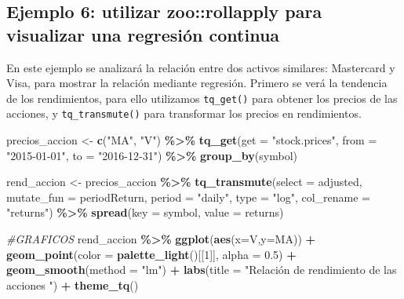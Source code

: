 \documentclass[
]{book}
\newenvironment{Shaded}{\begin{snugshade}}{\end{snugshade}}
\newcommand{\AttributeTok}[1]{\textcolor[rgb]{0.13,0.29,0.53}{#1}}
\newcommand{\CommentTok}[1]{\textcolor[rgb]{0.56,0.35,0.01}{\textit{#1}}}
\newcommand{\DecValTok}[1]{\textcolor[rgb]{0.00,0.00,0.81}{#1}}
\newcommand{\FloatTok}[1]{\textcolor[rgb]{0.00,0.00,0.81}{#1}}
\newcommand{\FunctionTok}[1]{\textcolor[rgb]{0.13,0.29,0.53}{\textbf{#1}}}
\newcommand{\NormalTok}[1]{#1}
\newcommand{\OtherTok}[1]{\textcolor[rgb]{0.56,0.35,0.01}{#1}}
\newcommand{\SpecialCharTok}[1]{\textcolor[rgb]{0.81,0.36,0.00}{\textbf{#1}}}
\newcommand{\StringTok}[1]{\textcolor[rgb]{0.31,0.60,0.02}{#1}}
\begin{document}
\hypertarget{ejemplo-6-utilizar-zoorollapply-para-visualizar-una-regresiuxf3n-continua}{%
\subsection{Ejemplo 6: utilizar zoo::rollapply para visualizar una regresión continua}\label{ejemplo-6-utilizar-zoorollapply-para-visualizar-una-regresiuxf3n-continua}}

En este ejemplo se analizará la relación entre dos activos similares: Mastercard y Visa, para mostrar la relación mediante regresión. Primero se verá la tendencia de los rendimientos, para ello utilizamos \texttt{tq\_get()} para obtener los precios de las acciones, y \texttt{tq\_transmute()} para transformar los precios en rendimientos.

\begin{Shaded}
\begin{Highlighting}[]
\NormalTok{precios\_accion }\OtherTok{\textless{}{-}} \FunctionTok{c}\NormalTok{(}\StringTok{"MA"}\NormalTok{, }\StringTok{"V"}\NormalTok{) }\SpecialCharTok{\%\textgreater{}\%}
    \FunctionTok{tq\_get}\NormalTok{(}\AttributeTok{get  =} \StringTok{"stock.prices"}\NormalTok{,}
           \AttributeTok{from =} \StringTok{"2015{-}01{-}01"}\NormalTok{,}
           \AttributeTok{to   =} \StringTok{"2016{-}12{-}31"}\NormalTok{) }\SpecialCharTok{\%\textgreater{}\%}
    \FunctionTok{group\_by}\NormalTok{(symbol) }

\NormalTok{rend\_accion }\OtherTok{\textless{}{-}}\NormalTok{ precios\_accion }\SpecialCharTok{\%\textgreater{}\%}
    \FunctionTok{tq\_transmute}\NormalTok{(}\AttributeTok{select     =}\NormalTok{ adjusted,}
                 \AttributeTok{mutate\_fun =}\NormalTok{ periodReturn,}
                 \AttributeTok{period     =} \StringTok{"daily"}\NormalTok{,}
                 \AttributeTok{type       =} \StringTok{"log"}\NormalTok{,}
                 \AttributeTok{col\_rename =} \StringTok{"returns"}\NormalTok{) }\SpecialCharTok{\%\textgreater{}\%}
    \FunctionTok{spread}\NormalTok{(}\AttributeTok{key =}\NormalTok{ symbol, }\AttributeTok{value =}\NormalTok{ returns)}

\CommentTok{\#GRAFICOS}
\NormalTok{rend\_accion }\SpecialCharTok{\%\textgreater{}\%}
    \FunctionTok{ggplot}\NormalTok{(}\FunctionTok{aes}\NormalTok{(}\AttributeTok{x=}\NormalTok{V,}\AttributeTok{y=}\NormalTok{MA)) }\SpecialCharTok{+}
    \FunctionTok{geom\_point}\NormalTok{(}\AttributeTok{color =} \FunctionTok{palette\_light}\NormalTok{()[[}\DecValTok{1}\NormalTok{]], }\AttributeTok{alpha =} \FloatTok{0.5}\NormalTok{) }\SpecialCharTok{+}
    \FunctionTok{geom\_smooth}\NormalTok{(}\AttributeTok{method =} \StringTok{"lm"}\NormalTok{) }\SpecialCharTok{+}
    \FunctionTok{labs}\NormalTok{(}\AttributeTok{title =} \StringTok{"Relación de rendimiento de las acciones "}\NormalTok{) }\SpecialCharTok{+}
    \FunctionTok{theme\_tq}\NormalTok{()}
\end{Highlighting}
\end{Shaded}
\end{document}
